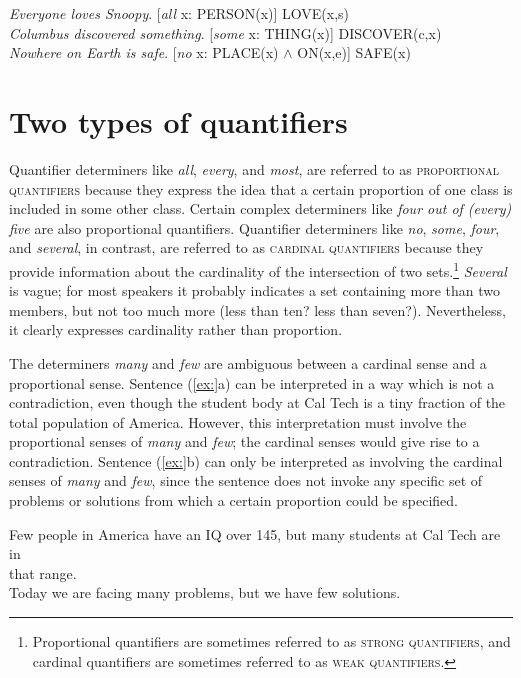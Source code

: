 \ea
\ea \textit{Everyone loves Snoopy}.  [\textit{all} x: PERSON(x)] LOVE(x,s)\\
\ex \textit{Columbus discovered something}.  [\textit{some} x: THING(x)] DISCOVER(c,x)\\
\ex \textit{Nowhere on Earth is safe}.  [\textit{no} x: PLACE(x) $\wedge$ ON(x,e)] SAFE(x)
                       \z
\z

\section{Two types of quantifiers}\label{sec:14.4}

Quantifier determiners like \textit{all}, \textit{every}, and \textit{most}, are referred to as \textsc{proportional quantifiers} because they express the idea that a certain proportion of one class is included in some other class. Certain complex determiners like \textit{four out of (every) five} are also proportional quantifiers. Quantifier determiners like \textit{no}, \textit{some}, \textit{four}, and \textit{several}, in contrast, are referred to as \textsc{cardinal quantifiers} because they provide information about the cardinality of the intersection of two sets.\footnote{Proportional quantifiers are sometimes referred to as \textsc{strong} \textsc{quantifiers}, and cardinal quantifiers are sometimes referred to as \textsc{weak} \textsc{quantifiers}.} \textit{Several} is vague; for most speakers it probably indicates a set containing more than two members, but not too much more (less than ten? less than seven?). Nevertheless, it clearly expresses cardinality rather than proportion.



The determiners \textit{many} and \textit{few} are ambiguous between a cardinal sense and a proportional sense. Sentence (\ref{ex:}a) can be interpreted in a way which is not a contradiction, even though the student body at Cal Tech is a tiny fraction of the total population of America. However, this interpretation must involve the proportional senses of \textit{many} and \textit{few}; the cardinal senses would give rise to a contradiction. Sentence (\ref{ex:}b) can only be interpreted as involving the cardinal senses of \textit{many} and \textit{few}, since the sentence does not invoke any specific set of problems or solutions from which a certain proportion could be specified.


\ea
\ea Few people in America have an IQ over 145, but many students at Cal Tech are in\\
  that range.\\
\ex Today we are facing many problems, but we have few solutions.
                       \z
\z


